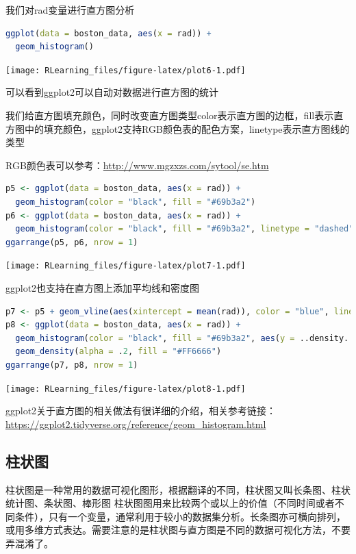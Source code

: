 \documentclass[]{ctexbook}
\begin{document}
我们对rad变量进行直方图分析

\begin{lstlisting}[language=R]
ggplot(data = boston_data, aes(x = rad)) +
  geom_histogram()
\end{lstlisting}

\texttt{[image: RLearning\_files/figure-latex/plot6-1.pdf]}

可以看到ggplot2可以自动对数据进行直方图的统计

我们给直方图填充颜色，同时改变直方图类型color表示直方图的边框，fill表示直方图中的填充颜色，ggplot2支持RGB颜色表的配色方案，linetype表示直方图线的类型

RGB颜色表可以参考：\url{http://www.mgzxzs.com/sytool/se.htm}

\begin{lstlisting}[language=R]
p5 <- ggplot(data = boston_data, aes(x = rad)) +
  geom_histogram(color = "black", fill = "#69b3a2")
p6 <- ggplot(data = boston_data, aes(x = rad)) +
  geom_histogram(color = "black", fill = "#69b3a2", linetype = "dashed")
ggarrange(p5, p6, nrow = 1)
\end{lstlisting}

\texttt{[image: RLearning\_files/figure-latex/plot7-1.pdf]}

ggplot2也支持在直方图上添加平均线和密度图

\begin{lstlisting}[language=R]
p7 <- p5 + geom_vline(aes(xintercept = mean(rad)), color = "blue", linetype = "dashed", size = 1)
p8 <- ggplot(data = boston_data, aes(x = rad)) +
  geom_histogram(color = "black", fill = "#69b3a2", aes(y = ..density..)) +
  geom_density(alpha = .2, fill = "#FF6666")
ggarrange(p7, p8, nrow = 1)
\end{lstlisting}

\texttt{[image: RLearning\_files/figure-latex/plot8-1.pdf]}

ggplot2关于直方图的相关做法有很详细的介绍，相关参考链接：\url{https://ggplot2.tidyverse.org/reference/geom_histogram.html}

\hypertarget{ux67f1ux72b6ux56fe}{%
\subsection{柱状图}\label{ux67f1ux72b6ux56fe}}

柱状图是一种常用的数据可视化图形，根据翻译的不同，柱状图又叫长条图、柱状统计图、条状图、棒形图
柱状图图用来比较两个或以上的价值（不同时间或者不同条件），只有一个变量，通常利用于较小的数据集分析。长条图亦可横向排列，或用多维方式表达。需要注意的是柱状图与直方图是不同的数据可视化方法，不要弄混淆了。
\end{document}

